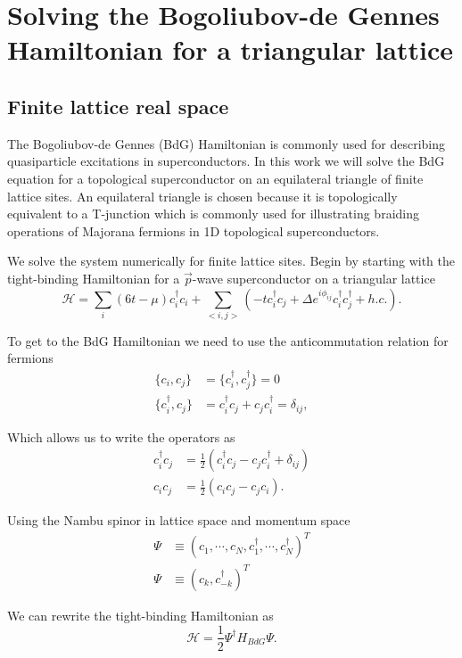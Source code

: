 \chapter{Solving the Bogoliubov-de Gennes Hamiltonian for a triangular lattice}
\section{Finite lattice real space}
The Bogoliubov-de Gennes (BdG) Hamiltonian is commonly used for describing quasiparticle excitations in superconductors. In this work we will solve the BdG equation for a topological  superconductor on an equilateral triangle of finite lattice sites. An equilateral triangle is chosen because it is topologically equivalent to a T-junction which is commonly used for illustrating braiding operations of Majorana fermions in 1D topological superconductors. 

We solve the system numerically for finite lattice sites. Begin by starting with the tight-binding Hamiltonian for a $\vec{p}$-wave superconductor on a triangular lattice
\begin{equation}
\mathcal{H} = \sum\limits_{i} (6t-\mu)c^{\dagger}_{i}c_{i} + \sum\limits_{<i,j>} \left(-tc^{\dagger}_{i}c_{j} + \Delta e^{i\phi_{ij}}c^{\dagger}_{i}c^{\dagger}_{j} + h.c.\right).
\end{equation}

To get to the BdG Hamiltonian we need to use the anticommutation relation for fermions
\begin{align}
\{c_i,c_j\} &= \{c_i^\dagger,c_j^\dagger\} = 0 \\
\{c_i^\dagger,c_j\} &= c_i^\dagger c_j + c_j c_i^\dagger = \delta_{ij},
\end{align}

Which allows us to write the operators as
\begin{align}
c_i^\dagger c_j &= \frac{1}{2}(c_i^\dagger c_j - c_j c_i^\dagger + \delta_{ij}) \\
c_i c_j &= \frac{1}{2}(c_i c_j - c_j c_i ).
\end{align}

Using the Nambu spinor in lattice space and momentum space
\begin{align}
  \Psi &\equiv (c_1,\cdots,c_N,c_1^\dagger,\cdots,c_N^\dagger)^T \\
  \Psi &\equiv (c_k, c_{-k}^\dagger)^T
\end{align}

We can rewrite the tight-binding Hamiltonian as
\begin{equation}
\mathcal{H} = \frac{1}{2}\Psi^{\dagger}H_{BdG}\Psi.
\label{eqn=CompactHamiltonian}
\end{equation}

